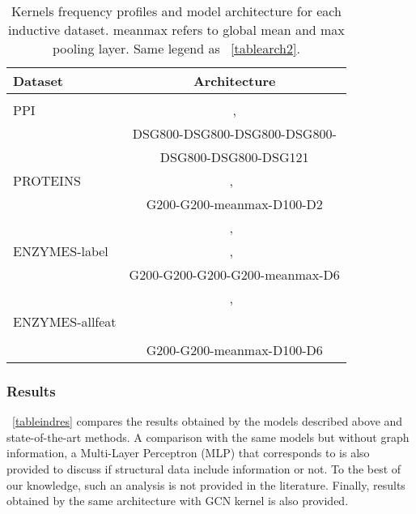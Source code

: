 \documentclass{article}
\begin{document}
\begin{table}\renewcommand{\arraystretch}{1.3}
\caption{Kernels frequency profiles and model architecture for each inductive  dataset. meanmax refers to global mean and max pooling layer. \newline Same legend as \tablename~\ref{tablearch2}.}
\centering

\begin{tabular}{l c  }
\hline
Dataset & Architecture\\
\hline 
&   \\
PPI & ~,~ \\ 
   & DSG800-DSG800-DSG800-DSG800-\\
   & DSG800-DSG800-DSG121\\
\hline

PROTEINS & ,~ \\
   & G200-G200-meanmax-D100-D2\\
\hline

& ,~\\
ENZYMES-label  & ,~\\ 
& G200-G200-G200-G200-meanmax-D6\\
\hline

& ,~ \\
ENZYMES-allfeat & \\
&  \\
& G200-G200-meanmax-D100-D6\\
\hline

\end{tabular}
\label{tablearch3}
\medskip
\end{table}

\subsubsection{Results} 

\tablename~\ref{tableindres} compares the results obtained by the models described above and state-of-the-art methods. A comparison with the same models but without graph information, a Multi-Layer Perceptron (MLP) that corresponds to  is also provided to discuss if structural data include information or not. To the best of our knowledge, such an analysis is not provided in the literature. Finally, results obtained by the same architecture with GCN kernel is also provided.
\end{document}
